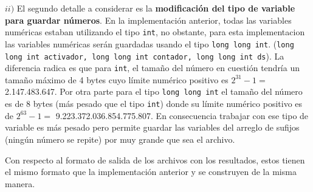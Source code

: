 $ii)$ El segundo detalle a considerar es la \textbf{modificación del tipo de variable para guardar números}. En la implementación anterior, todas las variables numéricas estaban utilizando el tipo \texttt{int}, no obstante, para esta implementacion las variables numéricas serán guardadas usando el tipo \texttt{long long int}. (\texttt{long long int activador, long long int contador, long long int ds}). La diferencia radica es que para \texttt{int}, el tamaño del número en cuestión tendría un tamaño máximo de 4 bytes cuyo límite numérico positivo es $2^{31}-1 =$ 2.147.483.647. Por otra parte para el tipo \texttt{long long int} el tamaño del número es de 8 bytes (más pesado que el tipo \texttt{int}) donde su límite numérico positivo es de $2^{63}-1 =$ 9.223.372.036.854.775.807. En consecuencia trabajar con ese tipo de variable es más pesado pero permite guardar las variables del arreglo de sufijos (ningún número se repite) por muy grande que sea el archivo.

Con respecto al formato de salida de los archivos con los resultados, estos tienen el mismo formato que la implementación anterior y se construyen de la misma manera.

